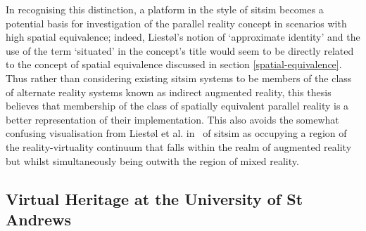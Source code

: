In recognising this distinction, a platform in the style of sitsim becomes a potential basis for investigation of the parallel reality concept in scenarios with high spatial equivalence; indeed, Liest\o l's notion of `approximate identity' and the use of the term `situated' in the concept's title would seem to be directly related to the concept of spatial equivalence discussed in section \ref{spatial-equivalence}. Thus rather than considering existing sitsim systems to be members of the class of alternate reality systems known as indirect augmented reality, this thesis believes that membership of the class of spatially equivalent parallel reality is a better representation of their implementation. This also avoids the somewhat confusing visualisation from Liest\o l et al. in~\cite{Liestøl2011} of sitsim as occupying a region of the reality-virtuality continuum that falls within the realm of augmented reality but whilst simultaneously being outwith the region of mixed reality.



\subsection{Virtual Heritage at the University of St Andrews}

\label{virtual-heritage-at-st-andrews}


